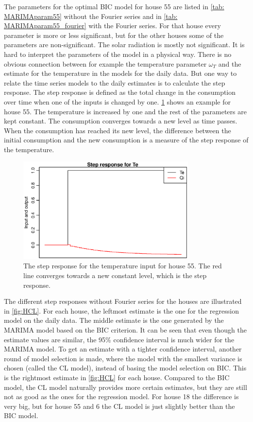 \noindent The parameters for the optimal BIC model for house 55 are listed in \cref{tab: MARIMAparam55} without the Fourier series and in \cref{tab: MARIMAparam55_fourier} with the Fourier series. For that house every parameter is more or less significant, but for the other houses some of the parameters are non-significant. The solar radiation is mostly not significant. It is hard to interpret the parameters of the model in a physical way. There is no obvious connection between for example the temperature parameter $\omega_T$ and the estimate for the temperature in the models for the daily data. But one way to relate the time series models to the daily estimates is to calculate the step response. The step response is defined as the total change in the consumption over time when one of the inputs is changed by one. \cref{fig:StepResponse55} shows an example for house 55. The temperature is increased by one and the rest of the parameters are kept constant. The consumption converges towards a new level as time passes. When the consumption has reached its new level, the difference between the initial consumption and the new consumption is a measure of the step response of the temperature.
\begin{figure}[ht]
    \centering
    \includegraphics[width=0.8\textwidth]{../../../figures/StepResponse.eps}
    \caption{The step response for the temperature input for house 55. The red line converges towards a new constant level, which is the step response.}
    \label{fig:StepResponse55}
\end{figure}

\noindent The different step responses without Fourier series for the houses are illustrated in \cref{fig:HCL}. For each house, the leftmost estimate is the one for the regression model on the daily data. The middle estimate is the one generated by the MARIMA model based on the BIC criterion. It can be seen that even though the estimate values are similar, the 95\% confidence interval is much wider for the MARIMA model. To get an estimate with a tighter confidence interval, another round of model selection is made, where the model with the smallest variance is chosen (called the CL model), instead of basing the model selection on BIC. This is the rightmost estimate in \cref{fig:HCL} for each house. Compared to the BIC model, the CL model naturally provides more certain estimates, but they are still not as good as the ones for the regression model. For house 18 the difference is very big, but for house 55 and 6 the CL model is just slightly better than the BIC model.

